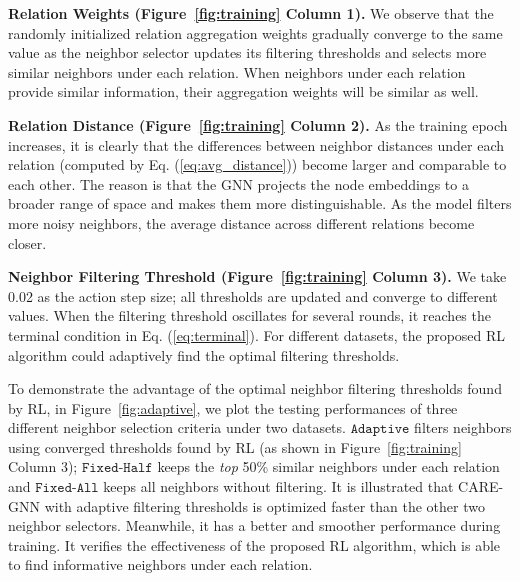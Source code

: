 \vspace{1mm}
\noindent \textbf{Relation Weights (Figure~\ref{fig:training} Column 1).}
We observe that the randomly initialized relation aggregation weights gradually converge to the same value as the neighbor selector updates its filtering thresholds and selects more similar neighbors under each relation.
When neighbors under each relation provide similar information, their aggregation weights will be similar as well.


\vspace{1mm}
\noindent \textbf{Relation Distance (Figure~\ref{fig:training} Column 2).}
As the training epoch increases, it is clearly that the differences between neighbor distances under each relation (computed by Eq. (\ref{eq:avg_distance})) become larger and comparable to each other.
The reason is that the GNN projects the node embeddings to a broader range of space and makes them more distinguishable.
As the model filters more noisy neighbors, the average distance across different relations become closer.

\vspace{1mm}
\noindent \textbf{Neighbor Filtering Threshold (Figure~\ref{fig:training} Column 3).}
We take 0.02 as the action step size; all thresholds are updated and converge to different values.
When the filtering threshold oscillates for several rounds, it reaches the terminal condition in Eq. (\ref{eq:terminal}).
For different datasets, the proposed RL algorithm could adaptively find the optimal filtering thresholds.

To demonstrate the advantage of the optimal neighbor filtering thresholds found by RL, in Figure~\ref{fig:adaptive}, we plot the testing performances of three different neighbor selection criteria under two datasets. 
$\texttt{Adaptive}$ filters neighbors using converged thresholds found by RL (as shown in Figure~\ref{fig:training} Column 3); $\texttt{Fixed-Half}$ keeps the \textit{top} 50\% similar neighbors under each relation and $\texttt{Fixed-All}$ keeps all neighbors without filtering.   
It is illustrated that CARE-GNN with adaptive filtering thresholds is optimized faster than the other two neighbor selectors.
Meanwhile, it has a better and smoother performance during training. 
It verifies the effectiveness of the proposed RL algorithm, which is able to find informative neighbors under each relation.


























